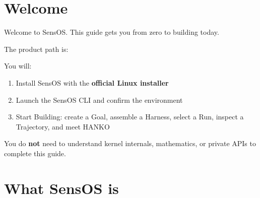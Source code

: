 \documentclass[11pt,a4paper,oneside]{article}
\begin{document}
\clearpage
{}
\setcounter{page}{1}

\tableofcontents
\clearpage

\section*{Welcome}

Welcome to SensOS. This guide gets you from zero to building today.

The product path is:

\begin{center}
\end{center}

You will:

\begin{enumerate}
  \item Install SensOS with the \textbf{official Linux installer}
  \item Launch the SensOS CLI and confirm the environment
  \item Start Building: create a Goal, assemble a Harness, select a Run, inspect a Trajectory, and meet HANKO
\end{enumerate}

\begin{importantbox}
You do \textbf{not} need to understand kernel internals, mathematics, or private APIs to complete this guide.
\end{importantbox}

\section{What SensOS is}
\label{sec:what}
\end{document}
